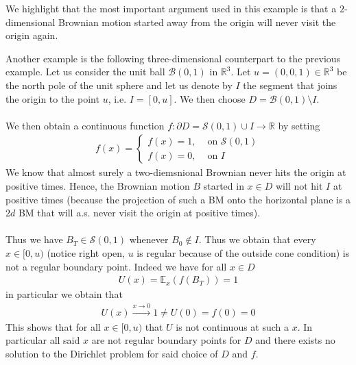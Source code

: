 \documentclass[../mainfile.tex]{subfiles}
\begin{document}
\begin{rem} We highlight that the most important argument used in this example is that a $2$-dimensional Brownian motion started away from the origin will never visit the origin again. 
\end{rem}
\newpage
\begin{exmp} Another example is the following three-dimensional counterpart to the previous example. Let us consider the unit ball $\mathcal{B}(0,1)$ in $\mathbb{R}^3$. Let $u=(0,0,1) \in \mathbb{R}^3$ be the north pole of the unit sphere and let us denote by $I$ the segment that joins the origin to the point $u$, i.e. $I=[0,u]$. We then choose $D = \mathcal{B}(0,1) \setminus I$.  \\
\\
We then obtain a continuous function $f: \partial D= \mathcal{S}(0,1) \cup I \to \mathbb{R}$ by setting 
\begin{align*}
f(x) = \begin{cases} f(x)=1,  &\text{ on } \mathcal{S}(0,1) \\ f(x)=0, & \text{ on } I  \end{cases}
\end{align*} 
We know that almost surely a two-diemsnional Brownian never hits the origin at positive times. Hence, the Brownian motion $B$ started in $x \in D$ will not hit $I$ at positive times (because the projection of such a BM onto the horizontal plane is a $2d$ BM that will a.s. never visit the origin at positive times). \\
\\
Thus we have $B_T \in \mathcal{S}(0,1)$ whenever $B_0 \notin I$. Thus we obtain that every $x \in [0,u)$ (notice right open, $u$ is regular because of the outside cone condition) is not a regular boundary point. Indeed we have for all $x \in D$ 
\begin{align*}
U(x)= \mathbb{E}_x(f(B_T))=1
\end{align*}
in particular we obtain that 
\begin{align*}
U(x) \overset{x \to 0}\longrightarrow 1 \neq U(0)= f(0)=0
\end{align*}
This shows that for all $x \in [0,u)$ that $U$ is not continuous at such a $x$. In particular all said $x$ are not regular boundary points for $D$ and there exists no solution to the Dirichlet problem for said choice of $D$ and $f$. 
\end{exmp}
\end{document}
